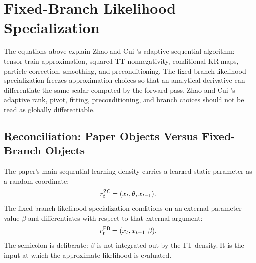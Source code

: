 \documentclass[11pt]{article}
\numberwithin{equation}{section}
\begin{document}
\section{Fixed-Branch Likelihood Specialization}

The equations above explain Zhao and Cui \cite{zhao2024ttsequential}'s adaptive
sequential algorithm: tensor-train approximation, squared-TT nonnegativity,
conditional KR maps, particle correction, smoothing, and preconditioning.  The
fixed-branch likelihood specialization freezes approximation choices so that
an analytical derivative can differentiate the same scalar computed by the
forward pass.  Zhao and Cui \cite{zhao2024ttsequential}'s adaptive rank, pivot,
fitting, preconditioning, and branch choices should not be read as globally
differentiable.

\subsection*{Reconciliation: Paper Objects Versus Fixed-Branch Objects}

The paper's main sequential-learning density carries a learned static
parameter as a random coordinate:
\begin{equation}
    r_t^{\rm ZC}=(x_t,\theta,x_{t-1}).
    \label{eq:p24-r1}
\end{equation}
The fixed-branch likelihood specialization conditions on an external parameter value
\(\beta\) and differentiates with respect to that external argument:
\begin{equation}
    r_t^{\rm FB}=(x_t,x_{t-1};\beta).
    \label{eq:p24-r2}
\end{equation}
The semicolon is deliberate: \(\beta\) is not integrated out by the TT density.
It is the input at which the approximate likelihood is evaluated.
\end{document}
